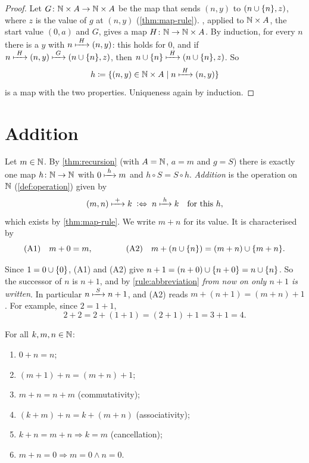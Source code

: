 \begin{proof}
Let $G \colon \mathbb{N} \times A \to \mathbb{N} \times A$ be the map that sends $(n, y)$ to $(n
\cup \lbrace n \rbrace, z)$, where $z$ is the value of $g$ at $(n, y)$ (\cref{thm:map-rule}).
, applied to $\mathbb{N} \times A$, the start value $(0, a)$ and $G$,
gives a map $H \colon \mathbb{N} \to \mathbb{N} \times A$. By induction, for every $n$ there is a
$y$ with $n \xmapsto{\;H\;} (n, y)$: this holds for $0$, and if $n \xmapsto{\;H\;} (n, y) \xmapsto{\;G\;} (n
\cup \lbrace n \rbrace, z)$, then $n \cup \lbrace n \rbrace \xmapsto{\;H\;} (n \cup \lbrace n \rbrace, z)$. So
\[
  h \coloneqq \lbrace (n, y) \in \mathbb{N} \times A \mid n \xmapsto{\;H\;} (n, y) \rbrace
\]
is a map with the two properties. Uniqueness again by induction.
\end{proof}

\section{Addition}

\begin{definition}[Addition]
\label{def:addition}
Let $m \in \mathbb{N}$. By \cref{thm:recursion} (with $A = \mathbb{N}$, $a = m$ and $g = S$) there
is exactly one map $h \colon \mathbb{N} \to \mathbb{N}$ with $0 \xmapsto{\;h\;} m$ and $h \circ S = S
\circ h$. \emph{Addition} is the operation on $\mathbb{N}$ (\cref{def:operation}) given by
\[
  (m, n) \xmapsto{\;+\;} k \;\mathrel{\vcentcolon\Leftrightarrow}\; n \xmapsto{\;h\;} k \quad \text{for this } h,
\]
which exists by \cref{thm:map-rule}. We write $m + n$ for its value. It is
characterised by
\[
  \text{(A1)}\quad m + 0 = m, \qquad\qquad \text{(A2)}\quad m + (n \cup \lbrace n \rbrace) =
  (m + n) \cup \lbrace m + n \rbrace.
\]
\end{definition}

Since $1 = 0 \cup \lbrace 0 \rbrace$, (A1) and (A2) give $n + 1 = (n + 0) \cup \lbrace n + 0 \rbrace =
n \cup \lbrace n \rbrace$. So the successor of $n$ is $n + 1$, and by
\cref{rule:abbreviation} \emph{from now on only $n + 1$ is written}. In particular
$n \xmapsto{\;S\;} n + 1$, and (A2) reads $m + (n + 1) = (m + n) + 1$. For example, since
$2 = 1 + 1$,
\[
  2 + 2 = 2 + (1 + 1) = (2 + 1) + 1 = 3 + 1 = 4.
\]

\begin{theorem}
\label{thm:addition-laws}
For all $k, m, n \in \mathbb{N}$:
\begin{enumerate}
  \item $0 + n = n$;
  \item $(m + 1) + n = (m + n) + 1$;
  \item $m + n = n + m$ (commutativity);
  \item $(k + m) + n = k + (m + n)$ (associativity);
  \item $k + n = m + n \Rightarrow k = m$ (cancellation);
  \item $m + n = 0 \Rightarrow m = 0 \land n = 0$.
\end{enumerate}
\end{theorem}

